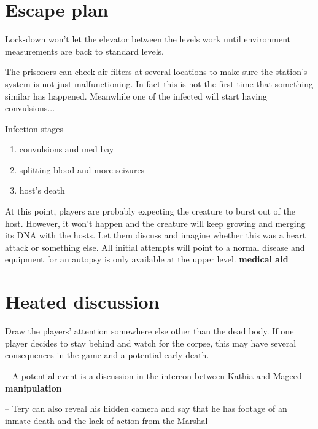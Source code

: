 \newsect

\newpage

\section{Escape plan}


\begin{rpg-commentbox}{}
    Lock-down won't let the elevator between the levels work until environment measurements are back to standard levels.
    
    
    The prisoners can check air filters at several locations to make sure the station's system is not just malfunctioning. In fact this is not the first time that something similar has happened. Meanwhile one of the infected will start having convulsions...

\end{rpg-commentbox}




\begin{rpg-commentbox}{Infection stages}
    \begin{enumerate}
        \item convulsions and med bay
        \item splitting blood and more seizures
        \item host's death
    \end{enumerate}

    At this point, players are probably expecting the creature to burst out of the host. However, it won't happen and the creature will keep growing and merging its DNA with the hosts. Let them discuss and imagine whether this was a heart attack or something else. All initial attempts will point to a normal disease and equipment for an autopsy is only available at the upper level.  \textbf{medical aid}

\end{rpg-commentbox}





\newsect

\section{Heated discussion}


\begin{rpg-commentbox}{}
    
    Draw the players' attention somewhere else other than the dead body. If one player decides to stay behind and watch for the corpse, this may have several consequences in the game and a potential early death.
    
    -- A potential event is a discussion in the intercon between Kathia and Mageed \textbf{manipulation}
    
    -- Tery can also reveal his hidden camera and say that he has footage of an inmate death and the lack of action from the Marshal

\end{rpg-commentbox}

